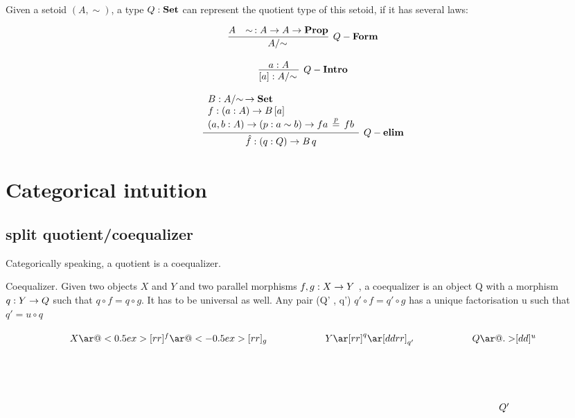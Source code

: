 Given a setoid $(A,\sim)$, a type $Q : \operatorname{\mathbf{Set}}$ can represent the quotient
type of this setoid, if it has several laws:



\begin{equation*}
\infer[Q-\bf{Form}]{\qset{A}}{A & \sim\, : A \rightarrow A \rightarrow \bf{Prop}}
\end{equation*}

\begin{equation*}
\infer[Q-\bf{Intro}]{[ a ] : \qset{A}}{a : A}
\end{equation*}

\begin{equation*}
\infer[Q-\bf{elim}]{\hat{f} : (q : Q) \rightarrow B \, q}{
\begin{array}{l}
B : \qset{A} \rightarrow  \bf{Set}\\
f : (a : A) \rightarrow B\, [ a ]\\
(a, b : A)  \rightarrow (p : a \sim b)  \rightarrow f a  \, \stackrel{p}{=} \, f b\\
\end{array}}
\end{equation*}
 

\section{Categorical intuition}


\subsection{split quotient/coequalizer}

Categorically speaking, a quotient is a coequalizer.

\begin{definition}
Coequalizer.
Given two objects $X$ and $Y$ and two parallel morphisms $f, g : X \rightarrow Y$ , a coequalizer is an object Q with a morphism $q : Y \rightarrow Q$ such that $q \circ f = q \circ g$. It has to be universal as well. Any pair (Q' , q') $q' \circ f = q' \circ g$ has a unique factorisation u such that $q' = u \circ q$
\end{definition}

\begin{displaymath}
    \xymatrix{X \ar@<0.5ex>[rr]^f \ar@<-0.5ex>[rr]_g && Y \ar[rr]^q
      \ar[ddrr]_{q'} && Q
      \ar@{.>}[dd]^u \\ \\
& &&& Q' }
\end{displaymath}


